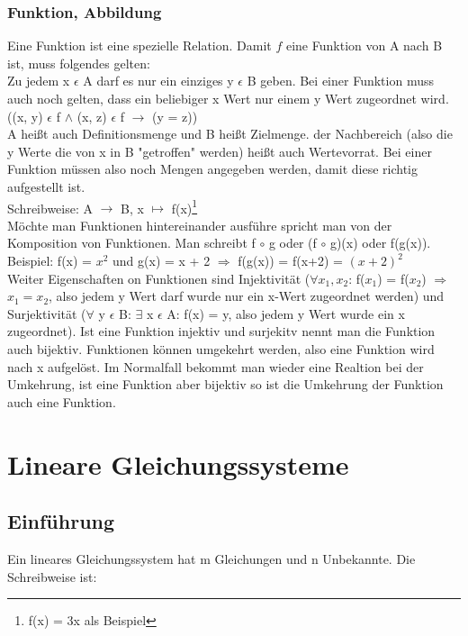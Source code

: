 \documentclass[a4paper,10pt]{scrartcl}
\begin{document}
        \subsubsection{Funktion, Abbildung}
            Eine Funktion ist eine spezielle Relation. Damit $f$ eine Funktion von A nach B ist, muss folgendes gelten:\\
            Zu jedem x $\epsilon$ A darf es nur ein einziges y $\epsilon$ B geben.
            Bei einer Funktion muss auch noch gelten, dass ein beliebiger x Wert nur einem y Wert zugeordnet wird. ((x, y) $\epsilon$ f $\wedge$ (x, z) $\epsilon$ f $\rightarrow$ (y = z)) \\
            A heißt auch Definitionsmenge und B heißt Zielmenge. der Nachbereich (also die y Werte die von x in B "getroffen" werden) heißt auch Wertevorrat. Bei einer Funktion müssen also noch 
            Mengen angegeben werden, damit diese richtig aufgestellt ist.  \\
            Schreibweise: A $\rightarrow$ B, x $\mapsto$ f(x)\footnote{f(x) = 3x als Beispiel } \\
            Möchte man Funktionen hintereinander ausführe spricht man von der Komposition von Funktionen. Man schreibt f $\circ$ g oder (f $\circ$ g)(x) oder f(g(x)).
            \\ Beispiel: f(x) = $x^2$ und g(x) = x + 2 $\Rightarrow$ f(g(x)) = f(x+2) = $(x + 2)^2$ \\
            Weiter Eigenschaften on Funktionen sind Injektivität ($\forall x_1,x_2$: f($x_1$) = f($x_2$) $\Rightarrow$ $x_1 = x_2$, also jedem y Wert darf wurde nur ein x-Wert zugeordnet werden)
            und Surjektivität ($\forall$ y $\epsilon$ B: $\exists$ x $\epsilon$ A: f(x) = y, also jedem y Wert wurde ein x zugeordnet). Ist eine Funktion injektiv und surjekitv nennt man
            die Funktion auch bijektiv. Funktionen können umgekehrt werden, also eine Funktion wird nach x aufgelöst. Im Normalfall bekommt man wieder eine Realtion bei der Umkehrung, ist eine Funktion 
            aber bijektiv so ist die Umkehrung der Funktion auch eine Funktion.  

    \section{Lineare Gleichungssysteme}
        \subsection{Einführung}
        Ein lineares Gleichungssystem hat m Gleichungen und n Unbekannte. Die Schreibweise ist:
        
\end{document}
